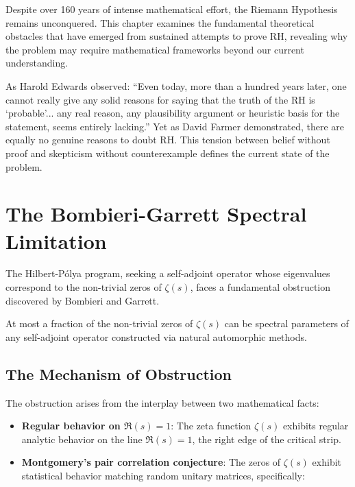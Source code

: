 \label{ch:obstructions}

Despite over 160 years of intense mathematical effort, the Riemann Hypothesis remains unconquered. This chapter examines the fundamental theoretical obstacles that have emerged from sustained attempts to prove RH, revealing why the problem may require mathematical frameworks beyond our current understanding.

As Harold Edwards observed: ``Even today, more than a hundred years later, one cannot really give any solid reasons for saying that the truth of the RH is `probable'... any real reason, any plausibility argument or heuristic basis for the statement, seems entirely lacking.'' Yet as David Farmer demonstrated, there are equally no genuine reasons to doubt RH. This tension between belief without proof and skepticism without counterexample defines the current state of the problem.

\section{The Bombieri-Garrett Spectral Limitation}
\label{sec:bombieri_garrett}

The Hilbert-P\'olya program, seeking a self-adjoint operator whose eigenvalues correspond to the non-trivial zeros of $\zeta(s)$, faces a fundamental obstruction discovered by Bombieri and Garrett.

\begin{theorem}
\label{thm:bombieri_garrett}
At most a fraction of the non-trivial zeros of $\zeta(s)$ can be spectral parameters of any self-adjoint operator constructed via natural automorphic methods.
\end{theorem}

\subsection{The Mechanism of Obstruction}

The obstruction arises from the interplay between two mathematical facts:

\begin{itemize}
\item \textbf{Regular behavior on $\Re(s) = 1$}: The zeta function $\zeta(s)$ exhibits regular analytic behavior on the line $\Re(s) = 1$, the right edge of the critical strip.
\item \textbf{Montgomery's pair correlation conjecture}: The zeros of $\zeta(s)$ exhibit statistical behavior matching random unitary matrices, specifically:
\end{itemize}

